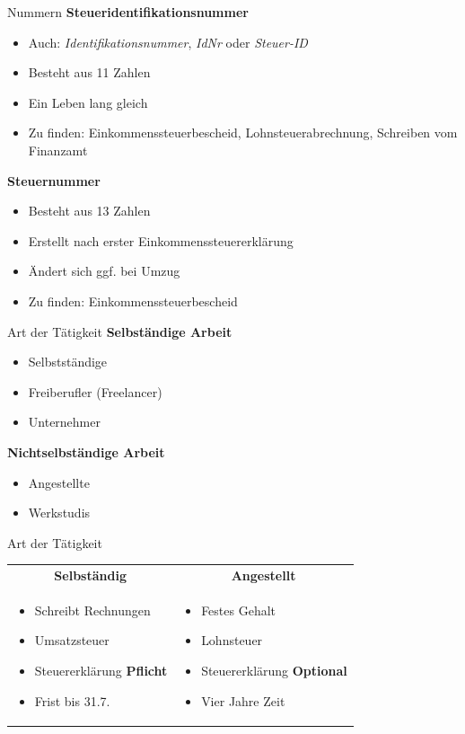 \documentclass{beamer}
\begin{document}
			\begin{frame}{Nummern}
				\textbf{Steueridentifikationsnummer}
				\begin{itemize}
					\item Auch: \textit{Identifikationsnummer}, \textit{IdNr} oder \textit{Steuer-ID}
					\item Besteht aus 11 Zahlen
					\item Ein Leben lang gleich
					\item Zu finden: Einkommenssteuerbescheid, Lohnsteuerabrechnung, Schreiben vom Finanzamt
				\end{itemize}
				\pause
				\textbf{Steuernummer}
				\begin{itemize}
					\item Besteht aus 13 Zahlen
					\item Erstellt nach erster Einkommenssteuererklärung
					\item Ändert sich ggf. bei Umzug
					\item Zu finden: Einkommenssteuerbescheid
				\end{itemize}
			\end{frame}
		
			\begin{frame}{Art der Tätigkeit}
				\textbf{Selbständige Arbeit}
				\begin{itemize}
					\item Selbstständige
					\item Freiberufler (Freelancer)
					\item Unternehmer
				\end{itemize}
				\pause
				\textbf{Nichtselbständige Arbeit}
				\begin{itemize}
					\item Angestellte
					\item Werkstudis
				\end{itemize}
			\end{frame}
		
			\begin{frame}{Art der Tätigkeit}
				\begin{tabularx}{\linewidth}{X|X}
					\multicolumn{1}{c|}{\textbf{Selbständig}\citewiki{Selbständigkeit\_(beruflich)\#Steuerrecht}} &
					\multicolumn{1}{c}{\textbf{Angestellt}} \\[0.25cm]
					\begin{itemize}
						\item Schreibt Rechnungen
						\item Umsatzsteuer
						\item Steuererklärung \textbf{Pflicht}
						\item Frist bis 31.7.
					\end{itemize} &
					\begin{itemize}
						\item Festes Gehalt
						\item Lohnsteuer
						\item Steuererklärung \textbf{Optional}
						\item Vier Jahre Zeit
					\end{itemize}
				\end{tabularx}
			\end{frame}
		
\end{document}
